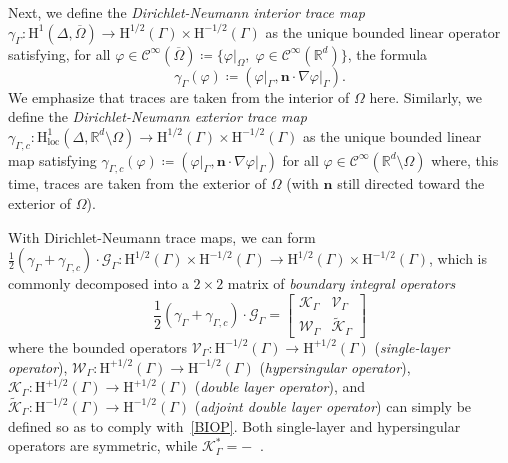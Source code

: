 \documentclass[a4paper,11pt]{article}
\newcommand{\RR}{\mathbb{R}}
\newcommand{\mrm}{\mathrm}
\newcommand{\mH}{\mathrm{H}}
\newcommand{\bn}{\boldsymbol{n}}
\newcommand{\lbr}{\lbrack}
\newcommand{\rbr}{\rbrack}
\DeclareMathOperator{\Kprime}{\tilde{\mathcal{K}}_{\Gamma}} %
\begin{document}
\medskip
Next, we define the \emph{Dirichlet-Neumann
interior trace map} $\gamma_{\Gamma}\colon \mH^{1}(\Delta,\overline{\Omega})\to
\mH^{1/2}(\Gamma)\times \mH^{-1/2}(\Gamma)$ as the unique bounded linear
operator satisfying, for all $\varphi\in \mathscr{C}^{\infty}(\overline{\Omega})
\coloneq\{\varphi\vert_{\Omega},\;\varphi\in\mathscr{C}^{\infty}(\RR^d)\}$,
the formula 
\begin{equation*}
  \gamma_{\Gamma}(\varphi)\coloneq
  (\varphi\vert_{\Gamma}, \bn\cdot\nabla
  \varphi\vert_{\Gamma}).
\end{equation*}
We emphasize that traces are taken from the interior of $\Omega$ here.
Similarly, we define the \emph{Dirichlet-Neumann exterior trace map}
$\gamma_{\Gamma,c}\colon \mH^{1}_{\mrm{loc}}(\Delta,\RR^d\setminus{\Omega})
\to\mH^{1/2}(\Gamma)\times \mH^{-1/2}(\Gamma)$ as the unique bounded
linear map satisfying $ \gamma_{\Gamma,c}(\varphi)\coloneq
(\varphi\vert_{\Gamma}, \bn\cdot\nabla\varphi\vert_{\Gamma})$ for all
$\varphi\in \mathscr{C}^{\infty}(\RR^d\setminus\Omega)$ where, this
time, traces are taken from the exterior of $\Omega$ (with $\bn$ still
directed toward the exterior of $\Omega$).

With Dirichlet-Neumann trace maps, we can form
$\frac{1}{2}(\gamma_{\Gamma}+\gamma_{\Gamma,c})\cdot\mathcal{G}_{\Gamma}\colon
\mH^{1/2}(\Gamma)\times \mH^{-1/2}(\Gamma)\to \mH^{1/2}(\Gamma)\times
\mH^{-1/2}(\Gamma)$, which is commonly decomposed into a $2\times 2$ matrix
of \emph{boundary integral operators}
\begin{equation}\label{BIOP}
  \frac{1}{2}(\gamma_{\Gamma}+\gamma_{\Gamma,c})\cdot\mathcal{G}_{\Gamma} =
  \left\lbr\begin{array}{ll}
    \mathcal{K}_{\Gamma} & \mathcal{V}_{\Gamma}\\
    \mathcal{W}_{\Gamma} & \tilde{\mathcal{K}}_{\Gamma}
  \end{array}\right\rbr
\end{equation}
where the bounded operators $\mathcal{V}_{\Gamma}\colon \mH^{-1/2}(\Gamma)\to \mH^{+1/2}(\Gamma)$ (\emph{single-layer operator}),
$\mathcal{W}_{\Gamma}\colon \mH^{+1/2}(\Gamma)\to \mH^{-1/2}(\Gamma)$ (\emph{hypersingular operator}), 
$\mathcal{K}_{\Gamma}\colon \mH^{+1/2}(\Gamma)\to \mH^{+1/2}(\Gamma)$ (\emph{double layer operator}), and
$\tilde{\mathcal{K}}_{\Gamma}\colon \mH^{-1/2}(\Gamma)\to
\mH^{-1/2}(\Gamma)$ (\emph{adjoint double layer operator}) can simply
be defined so as to comply with~\eqref{BIOP}. Both single-layer and
hypersingular operators are symmetric, while \(\mathcal{K}_{\Gamma}^*
= - \Kprime\).
\end{document}
